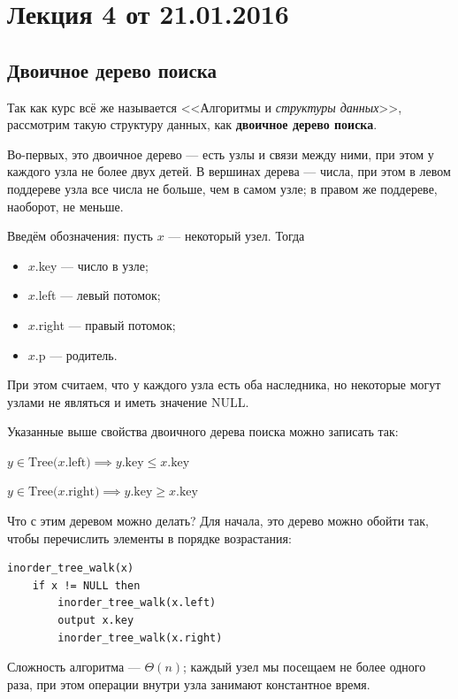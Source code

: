 


\section*{Лекция 4 от 21.01.2016}

\subsection*{Двоичное дерево поиска}

Так как курс всё же называется <<Алгоритмы и \emph{структуры данных}>>, рассмотрим такую структуру данных, как \textbf{двоичное дерево поиска}.

Во-первых, это двоичное дерево --- есть узлы и связи между ними, при этом у каждого узла не более двух детей.
В вершинах дерева --- числа, при этом в левом поддереве узла все числа не больше, чем в самом узле; в правом же поддереве, наоборот, не меньше.

Введём обозначения: пусть $x$ --- некоторый узел. Тогда
\begin{itemize}
    \item $x$.key --- число в узле;
    \item $x$.left --- левый потомок;
    \item $x$.right --- правый потомок;
    \item $x$.p --- родитель.
\end{itemize}

При этом считаем, что у каждого узла есть оба наследника, но некоторые могут узлами не являться и иметь значение NULL.

Указанные выше свойства двоичного дерева поиска можно записать так:

$y\in \text{Tree($x$.left)} \implies \text{$y$.key} \leqslant \text{$x$.key}$

$y\in \text{Tree($x$.right)} \implies \text{$y$.key} \geqslant \text{$x$.key}$

\vspace{0.6cm}

Что с этим деревом можно делать? Для начала, это дерево можно обойти так, чтобы перечислить элементы в порядке возрастания:

\begin{lstlisting}
inorder_tree_walk(x)
    if x != NULL then
        inorder_tree_walk(x.left)
        output x.key
        inorder_tree_walk(x.right)
\end{lstlisting}

Сложность алгоритма --- $\Theta(n)$; каждый узел мы посещаем не более одного раза, при этом операции внутри узла занимают константное время.

